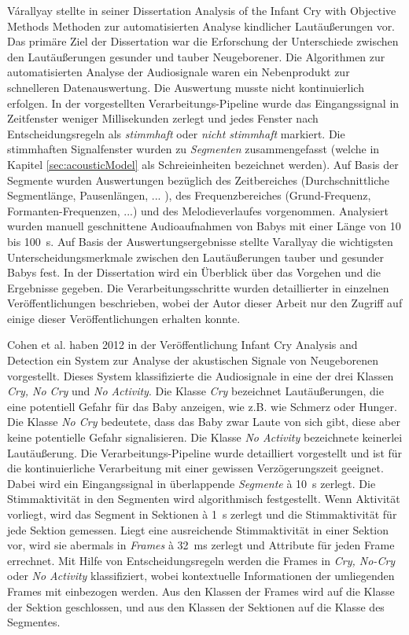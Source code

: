 Várallyay stellte in seiner Dissertation \glqq Analysis of the Infant Cry with Objective Methods\grqq{} \cite{cry_thesis} Methoden zur automatisierten Analyse kindlicher Lautäußerungen vor. Das primäre Ziel der Dissertation war die Erforschung der Unterschiede zwischen den Lautäußerungen gesunder und tauber Neugeborener. Die Algorithmen zur automatisierten Analyse der Audiosignale waren ein \glqq Nebenprodukt\grqq{} zur schnelleren Datenauswertung. Die Auswertung musste nicht kontinuierlich erfolgen. In der vorgestellten Verarbeitungs-Pipeline wurde das Eingangssignal in Zeitfenster weniger Millisekunden zerlegt und jedes Fenster nach Entscheidungsregeln als \emph{stimmhaft} oder \emph{nicht stimmhaft} markiert. Die stimmhaften Signalfenster wurden zu \emph{Segmenten} zusammengefasst (welche in Kapitel \ref{sec:acousticModel} als Schreieinheiten bezeichnet werden). Auf Basis der Segmente wurden Auswertungen bezüglich des Zeitbereiches (Durchschnittliche Segmentlänge, Pausenlängen, ... ), des Frequenzbereiches (Grund-Frequenz, Formanten-Frequenzen, ...) und des Melodieverlaufes vorgenommen. Analysiert wurden manuell geschnittene Audioaufnahmen von Babys mit einer Länge von 10 bis \SI{100}{\second}. Auf Basis der Auswertungsergebnisse stellte Varallyay die wichtigsten Unterscheidungsmerkmale zwischen den Lautäußerungen tauber und gesunder Babys fest. In der Dissertation \cite{cry_thesis} wird ein Überblick über das Vorgehen und die Ergebnisse gegeben. Die Verarbeitungsschritte wurden detaillierter in einzelnen Veröffentlichungen beschrieben, wobei der Autor dieser Arbeit nur den Zugriff auf einige dieser Veröffentlichungen erhalten konnte.

Cohen et al. haben 2012 in der Veröffentlichung \glqq Infant Cry Analysis and Detection\grqq{} \cite{cohenCry}  ein System zur Analyse der akustischen Signale von Neugeborenen vorgestellt. Dieses System klassifizierte die Audiosignale in eine der drei Klassen \emph{Cry, No Cry} und \emph{No Activity}. Die Klasse \emph{Cry} bezeichnet Lautäußerungen, die eine potentiell Gefahr für das Baby anzeigen, wie z.B. wie Schmerz oder Hunger. Die Klasse \emph{No Cry} bedeutete, dass das Baby zwar Laute von sich gibt, diese aber keine potentielle Gefahr signalisieren. Die Klasse \emph{No Activity} bezeichnete keinerlei Lautäußerung. Die Verarbeitungs-Pipeline wurde detailliert vorgestellt und ist für die kontinuierliche Verarbeitung mit einer gewissen Verzögerungszeit geeignet. Dabei wird ein Eingangssignal in überlappende \emph{Segmente} \`{a} \SI{10}{\second} zerlegt. Die Stimmaktivität in den Segmenten wird algorithmisch festgestellt. Wenn Aktivität vorliegt, wird das Segment in Sektionen \`{a} \SI{1}{\second} zerlegt und die Stimmaktivität für jede Sektion gemessen. Liegt eine ausreichende Stimmaktivität in einer Sektion vor, wird sie abermals in \emph{Frames} \`{a} \SI{32}{\milli\second} zerlegt und Attribute für jeden Frame errechnet. Mit Hilfe von Entscheidungsregeln werden die Frames in \emph{Cry, No-Cry} oder \emph{No Activity} klassifiziert, wobei kontextuelle Informationen der umliegenden Frames mit einbezogen werden. Aus den Klassen der Frames wird auf die Klasse der Sektion geschlossen, und aus den Klassen der Sektionen auf die Klasse des Segmentes. 

